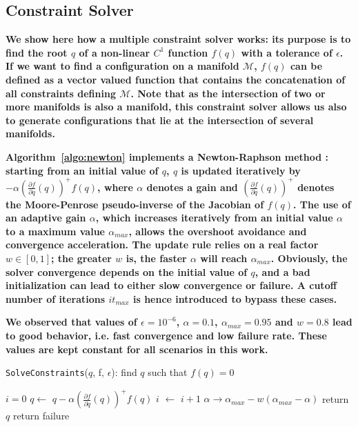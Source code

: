 \documentclass{article}
\newcommand\manifold{\mathcal{M}}
\begin{document}
\subsection{Constraint Solver}
\label{sec:SolveConstraints}

\textbf{We show here how a multiple constraint solver works: its
  purpose is to find the root $q$ of a non-linear $C^1$ function
  $f(q)$ with a tolerance of $\epsilon$. If we want to find a
  configuration on a manifold $\manifold$, $f(q)$ can be defined as a
  vector valued function that contains the concatenation of all
  constraints defining $\manifold$. Note that as the intersection of
  two or more manifolds is also a manifold, this constraint solver
  allows us also to generate configurations that lie at the
  intersection of several manifolds.}

\textbf{Algorithm~\ref{algo:newton} implements a Newton-Raphson method
  \cite{bonnans2006numerical}: starting from an initial value of $q$,
  $q$ is updated iteratively by $- \alpha \left(\frac{\partial
    f}{\partial q}(q)\right)^{+} f(q)$, where $\alpha$ denotes a gain
  and $\left(\frac{\partial f}{\partial q}(q)\right)^{+}$ denotes the
  Moore-Penrose pseudo-inverse of the Jacobian of $f(q)$. The use of
  an adaptive gain $\alpha$, which increases iteratively from an
  initial value $\alpha$ to a maximum value $\alpha_{max}$, allows the
  overshoot avoidance and convergence acceleration. The update rule
  relies on a real factor $w \in [0,1]$; the greater $w$ is, the
  faster $\alpha$ will reach $\alpha_{max}$. Obviously, the solver
  convergence depends on the initial value of $q$, and a bad
  initialization can lead to either slow convergence or failure. A
  cutoff number of iterations $it_{max}$ is hence introduced to bypass
  these cases.}

\textbf{We observed that values of $\epsilon=10^{-6}$,
  $\alpha=0.1$, $\alpha_{max}=0.95$ and $w=0.8$ lead to good behavior,
  i.e. fast convergence and low failure rate. These values are kept
  constant for all scenarios in this work.}

\begin{algorithm}
\caption{\texttt{SolveConstraints}($q$, f, $\epsilon$): find $q$
  such that $f(q) = 0$}
\label{algo:newton}
\begin{algorithmic}
\STATE $i=0$
\STATE $q \leftarrow$ $q - \alpha \left(\frac{\partial f}{\partial q}(q)\right)^{+} f(q)$
\STATE $i$ $\leftarrow$ $i+1$
\STATE $\alpha \rightarrow \alpha_{max} - w(\alpha_{max} - \alpha)$
\ENDWHILE
{}
\STATE return $q$
\ELSE
\STATE return failure
\ENDIF
\end{algorithmic}
\end{algorithm}
\end{document}
